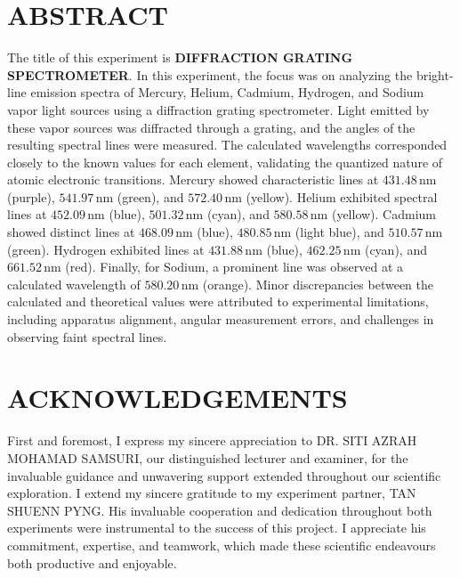 \documentclass[a4paper,11pt]{article}
\begin{document}
\section*{\large \center ABSTRACT}
\label{sec:ABSTRACT}

\qquad The title of this experiment is \textbf{DIFFRACTION GRATING SPECTROMETER}. In this experiment, the focus was on analyzing the bright-line emission spectra of Mercury, Helium, Cadmium, Hydrogen, and Sodium vapor light sources using a diffraction grating spectrometer. Light emitted by these vapor sources was diffracted through a grating, and the angles of the resulting spectral lines were measured. The calculated wavelengths corresponded closely to the known values for each element, validating the quantized nature of atomic electronic transitions. Mercury showed characteristic lines at \(431.48 \, \text{nm}\) (purple), \(541.97 \, \text{nm}\) (green), and \(572.40 \, \text{nm}\) (yellow). Helium exhibited spectral lines at \(452.09 \, \text{nm}\) (blue), \(501.32 \, \text{nm}\) (cyan), and \(580.58 \, \text{nm}\) (yellow). Cadmium showed distinct lines at \(468.09 \, \text{nm}\) (blue), \(480.85 \, \text{nm}\) (light blue), and \(510.57 \, \text{nm}\) (green). Hydrogen exhibited lines at \(431.88 \, \text{nm}\) (blue), \(462.25 \, \text{nm}\) (cyan), and \(661.52 \, \text{nm}\) (red). Finally, for Sodium, a prominent line was observed at a calculated wavelength of \(580.20 \, \text{nm}\) (orange). Minor discrepancies between the calculated and theoretical values were attributed to experimental limitations, including apparatus alignment, angular measurement errors, and challenges in observing faint spectral lines.

\newpage 
\section*{\large \center ACKNOWLEDGEMENTS}
\label{sec:ACKNOWLEDGEMENTS}

\qquad First and foremost, I express my sincere appreciation to DR. SITI AZRAH MOHAMAD SAMSURI, our distinguished lecturer and examiner, for the invaluable guidance and unwavering support extended throughout our scientific exploration. I extend my sincere gratitude to my experiment partner, TAN SHUENN PYNG. His invaluable cooperation and dedication throughout both experiments were instrumental to the success of this project. I appreciate his commitment, expertise, and teamwork, which made these scientific endeavours both productive and enjoyable.
\end{document}

